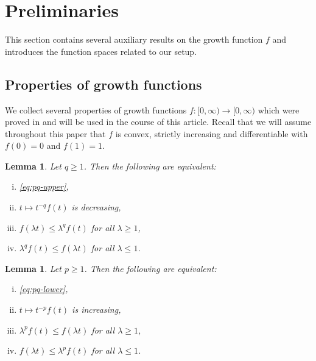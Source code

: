 \documentclass[11pt]{amsart}
\theoremstyle{plain}
\newtheorem{lemma}[theorem]{Lemma}
\theoremstyle{definition}
\numberwithin{equation}{section}
\begin{document}
\section{Preliminaries} \label{sec:preliminaries}
This section contains several auxiliary results on the growth function $f$ and introduces the function spaces related to our setup.
\subsection{Properties of growth functions}

We collect several properties of growth functions $f: [0, \infty) \to [0, \infty)$ which were proved in \cite{ChKiWe21} and will be used in the course of this article. 
Recall that we will assume throughout this paper that $f$ is convex, strictly increasing and differentiable with $f(0) = 0$ and $f(1) = 1$.

\begin{lemma}\cite[Lemma 2.1]{ChKiWe21}
\label{lem:upper}
Let $q \geq 1$. Then the following are equivalent:
\begin{enumerate} [(i)]
\vspace{-0.2cm}
\item \eqref{eq:pq-upper},
\item $t \mapsto t^{-q}f(t)$ is decreasing,
\item $f(\lambda t) \le \lambda^q f(t)$ for all $\lambda \ge 1$,
\item $\lambda^q f(t) \le f(\lambda t)$ for all $\lambda \le 1$.
\end{enumerate}
\end{lemma}

\begin{lemma}\cite[Lemma 2.2]{ChKiWe21}
\label{lem:lower}
Let $p \geq 1$. Then the following are equivalent:
\begin{enumerate}[(i)]
\vspace{-0.2cm}
\item \eqref{eq:pq-lower},
\item $t \mapsto t^{-p}f(t)$ is increasing,
\item $\lambda^p f(t) \le f(\lambda t)$ for all $\lambda \ge 1$,
\item $f(\lambda t) \le \lambda^p f(t)$ for all $\lambda \le 1$.
\end{enumerate}
\end{lemma}
\end{document}
